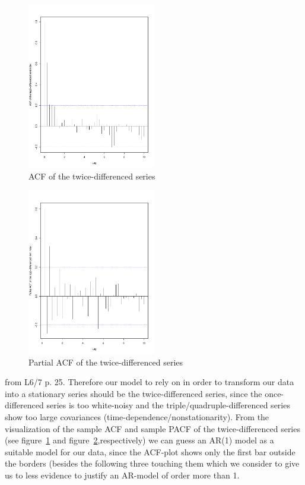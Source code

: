 \documentclass[11pt,a4paper]{article}
\begin{document}
\begin{figure}
\centering
\includegraphics[angle=0,
width=0.5\textwidth]{diff2_acf}
\caption{ACF of the twice-differenced series
\label{fig:diff2_acf}}
\end{figure}
\begin{figure}
\centering
\includegraphics[angle=0,
width=0.5\textwidth]{diff2_pacf}
\caption{Partial ACF of the twice-differenced series
\label{fig:diff2_pacf}}
\end{figure}
from L6/7 p. 25. 
Therefore our model to rely on in order to transform our data into a stationary series should be the twice-differenced series, since the once-differenced series is too white-noisy and the triple/quadruple-differenced series show too large covariances (time-dependence/nonstationarity). From the visualization of the sample ACF and sample PACF of the twice-differenced series (see figure~\ref{fig:diff2_acf} and figure~\ref{fig:diff2_pacf},respectively) we can guess an AR(1) model as a suitable model for our data, since the ACF-plot shows only the first bar outside the borders (besides the following three touching them which we consider to give us to less evidence to justify an AR-model of order more than 1.
\end{document}
